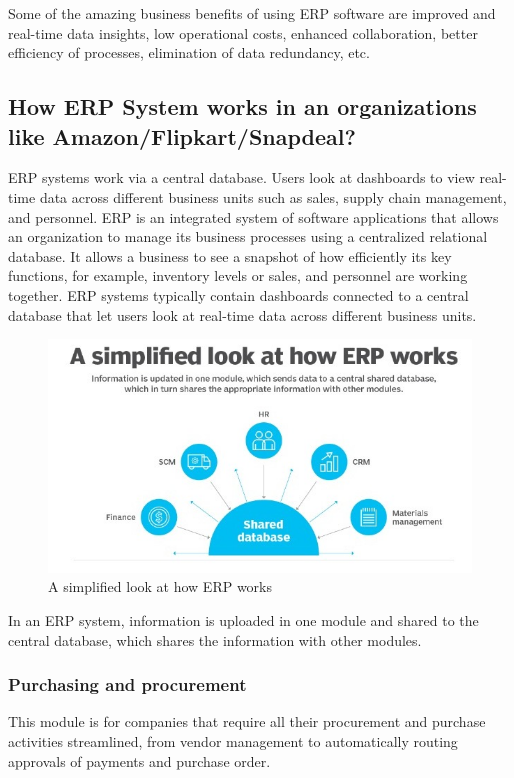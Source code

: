 \documentclass[twocolumn, 12pt, a4paper]{article}
\begin{document}
Some of the amazing business benefits of using ERP software are improved and real-time data insights, low operational costs, enhanced collaboration, better efficiency of processes, elimination of data redundancy, etc.

\subsection{How ERP System works in an organizations like Amazon/Flipkart/Snapdeal?}

ERP systems work via a central database. Users look at dashboards to view real-time data across different business units such as sales, supply chain management, and personnel.
ERP is an integrated system of software applications that allows an organization to manage its business processes using a centralized relational database. It allows a business to see a snapshot of how efficiently its key functions, for example, inventory levels or sales, and personnel are working together.
ERP systems typically contain dashboards connected to a central database that let users look at real-time data across different business units.

\begin{figure}[ht]
  \centering
  \includegraphics[width=\columnwidth]{howerpworks}
  \caption{A simplified look at how ERP works}
\end{figure}

In an ERP system, information is uploaded in one module and shared to the central database, which shares the information with other modules.

\subsubsection{Purchasing and procurement}
This module is for companies that require all their procurement and purchase activities streamlined, from vendor management to automatically routing approvals of payments and purchase order.
\end{document}
